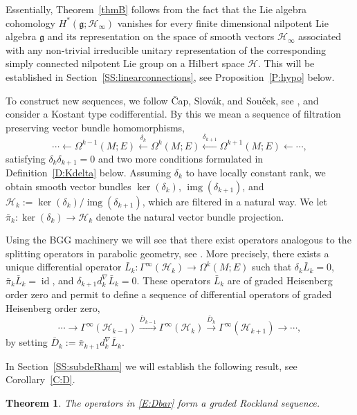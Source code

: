 \documentclass[reqno,12pt]{amsart}
\DeclareMathOperator{\img}{img}
\newcommand\goe{\mathfrak g}
\DeclareMathOperator{\id}{id}
\newcounter{ABC}
\theoremstyle{plain}
\newtheorem{thm}[ABC]{Theorem}
\theoremstyle{definition}
\begin{document}
Essentially, Theorem~\ref{thmB} follows from the fact that the Lie algebra cohomology $H^*(\goe;\mathcal H_\infty)$ vanishes for every finite dimensional nilpotent Lie algebra $\goe$ and its representation on the space of smooth vectors $\mathcal H_\infty$ associated with any non-trivial irreducible unitary representation of the corresponding simply connected nilpotent Lie group on a Hilbert space $\mathcal H$.
This will be established in Section~\ref{SS:linearconnections}, see Proposition~\ref{P:hypo} below.


To construct new sequences, we follow {\v{C}}ap, Slov{\'a}k, and Sou{\v{c}}ek, see \cite{CSS01}, and consider a Kostant type codifferential.
By this we mean a sequence of filtration preserving vector bundle homomorphisms,
$$
\cdots\leftarrow\Omega^{k-1}(M;E)\xleftarrow{\delta_k}\Omega^k(M;E)\xleftarrow{\delta_{k+1}}\Omega^{k+1}(M;E)\leftarrow\cdots,
$$
satisfying  $\delta_k\delta_{k+1}=0$ and two more conditions formulated in Definition~\ref{D:Kdelta} below.
Assuming $\delta_k$ to have locally constant rank, we obtain smooth vector bundles $\ker(\delta_k)$, $\img(\delta_{k+1})$, and $\mathcal H_k:=\ker(\delta_k)/\img(\delta_{k+1})$, which are filtered in a natural way.
We let $\bar\pi_k\colon\ker(\delta_k)\to\mathcal H_k$ denote the natural vector bundle projection.


Using the BGG machinery \cite{CSS01,CD01,CS12,CS15} we will see that there exist operators analogous to the splitting operators in parabolic geometry, see \cite[Theorem~2.4]{CS12}.
More precisely, there exists a unique differential operator $\bar L_k\colon\Gamma^\infty(\mathcal H_k)\to\Omega^k(M;E)$ such that $\delta_k\bar L_k=0$, $\bar\pi_k\bar L_k=\id$, and $\delta_{k+1}d^\nabla_k\bar L_k=0$.
These operators $\bar L_k$ are of graded Heisenberg order zero and permit to define a sequence of differential operators of graded Heisenberg order zero,
\begin{equation}\label{E:Dbar}
\cdots\to\Gamma^\infty(\mathcal H_{k-1})\xrightarrow{\bar D_{k-1}}\Gamma^\infty(\mathcal H_k)\xrightarrow{\bar D_k}\Gamma^\infty(\mathcal H_{k+1})\to\cdots,
\end{equation}
by setting $\bar D_k:=\bar\pi_{k+1}d^\nabla_k\bar L_k$. 


In Section~\ref{SS:subdeRham} we will establish the following result, see Corollary~\ref{C:D}.


\begin{thm}\label{thmC}
The operators in \eqref{E:Dbar} form a graded Rockland sequence.
\end{thm}
\end{document}
